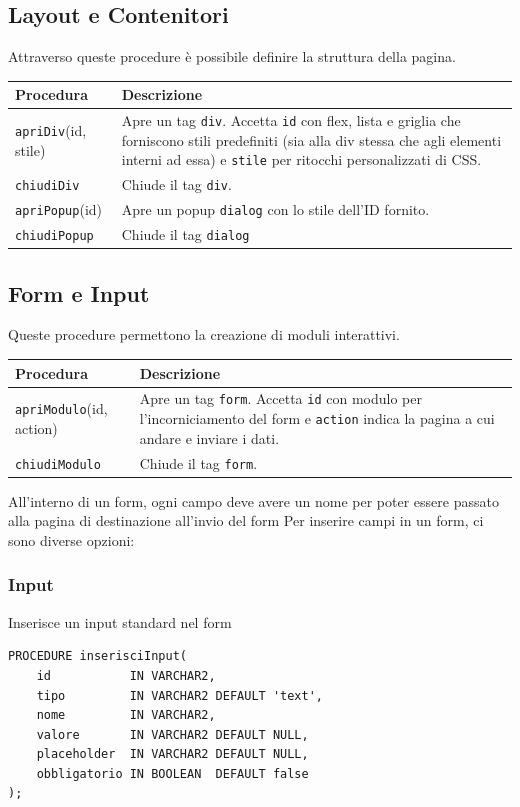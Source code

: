 \documentclass[a4paper,12pt]{article}
\begin{document}
\newpage
\subsection{Layout e Contenitori}
Attraverso queste procedure è possibile definire la struttura della pagina.

\begin{longtable}{@{}p{5cm} p{8cm}@{}}
\toprule
\textbf{Procedura} & \textbf{Descrizione} \\ \midrule
\texttt{apriDiv}(id, stile) & Apre un tag \texttt{div}. Accetta \texttt{id} con flex, lista e griglia che forniscono stili predefiniti (sia alla div stessa che agli elementi interni ad essa) e \texttt{stile} per ritocchi personalizzati di CSS. \\
\texttt{chiudiDiv} & Chiude il tag \texttt{div}. \\
\texttt{apriPopup}(id) & Apre un popup \texttt{dialog} con lo stile dell'ID fornito. \\
\texttt{chiudiPopup} & Chiude il tag \texttt{dialog} \\
\bottomrule
\end{longtable}

\subsection{Form e Input}
Queste procedure permettono la creazione di moduli interattivi.

\begin{longtable}{@{}p{5cm} p{8cm}@{}}
\toprule
\textbf{Procedura} & \textbf{Descrizione} \\ \midrule
\texttt{apriModulo}(id, action) & Apre un tag \texttt{form}. Accetta \texttt{id} con modulo per l'incorniciamento del form e \texttt{action} indica la pagina a cui andare e inviare i dati. \\
\texttt{chiudiModulo} & Chiude il tag \texttt{form}. \\
\bottomrule
\end{longtable}

All'interno di un form, ogni campo deve avere un nome per poter essere passato alla pagina di destinazione all'invio del form
Per inserire campi in un form, ci sono diverse opzioni:
\subsubsection{Input}
Inserisce un input standard nel form

\begin{lstlisting}[caption={firma della procedura InserisciInput}]
PROCEDURE inserisciInput(
    id           IN VARCHAR2,
    tipo         IN VARCHAR2 DEFAULT 'text',
    nome         IN VARCHAR2,
    valore       IN VARCHAR2 DEFAULT NULL,
    placeholder  IN VARCHAR2 DEFAULT NULL,
    obbligatorio IN BOOLEAN  DEFAULT false
);
\end{lstlisting}
\end{document}
